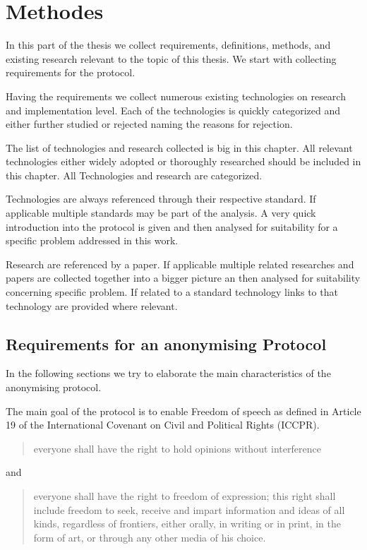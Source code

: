 

\part{Methodes}
In this part of the thesis we collect requirements, definitions, methods, and existing research relevant to the topic of this thesis. We start with collecting requirements for the protocol. 

Having the requirements we collect numerous existing technologies on research and implementation level. Each of the technologies is quickly categorized and either further studied or rejected naming the reasons for rejection.

The list of technologies and research collected is big in this chapter. All relevant technologies either widely adopted or thoroughly researched should be included in this chapter. All Technologies and research are categorized. 

Technologies are always referenced through their respective standard. If applicable multiple standards may be part of the analysis. A very quick introduction into the protocol is given and then analysed for suitability for a specific problem addressed in this work.

Research are referenced by a paper. If applicable multiple related researches and papers are collected together into a bigger picture an then analysed for suitability concerning specific problem. If related to a standard technology links to that technology are provided where relevant.

\chapter{Requirements for an anonymising Protocol\label{sec:genRequirements}}
In the following sections we try to elaborate the main characteristics of the anonymising protocol. 

The main goal of the protocol is to enable Freedom of speech as defined in Article 19 of the International Covenant on Civil and Political Rights (ICCPR)\cite{iccpr}.
\begin{quote}
	everyone shall have the right to hold opinions without interference 
\end{quote}
and
\begin{quote}
	everyone shall have the right to freedom of expression; this right shall include freedom to seek, receive and impart information and ideas of all kinds, regardless of frontiers, either orally, in writing or in print, in the form of art, or through any other media of his choice.
\end{quote}

